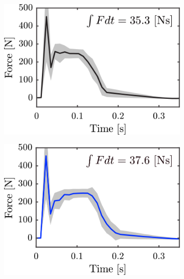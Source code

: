 \begin{figure}
\centering
  \begin{subfigure}{0.32\textwidth}
  \centering
  \includegraphics[width=.95\linewidth]{STYLESTUFF/impulsecompare1.png}
   \caption{}
    \label{fig:imp1}
  \end{subfigure}
    \begin{subfigure}{0.32\textwidth}
  \centering
  \includegraphics[width=.95\linewidth]{STYLESTUFF/impulsecompare2.png}
   \caption{}
    \label{fig:imp2}
  \end{subfigure}
  \begin{subfigure}{0.32\textwidth}
    \centering

\end{subfigure}
\end{figure}
